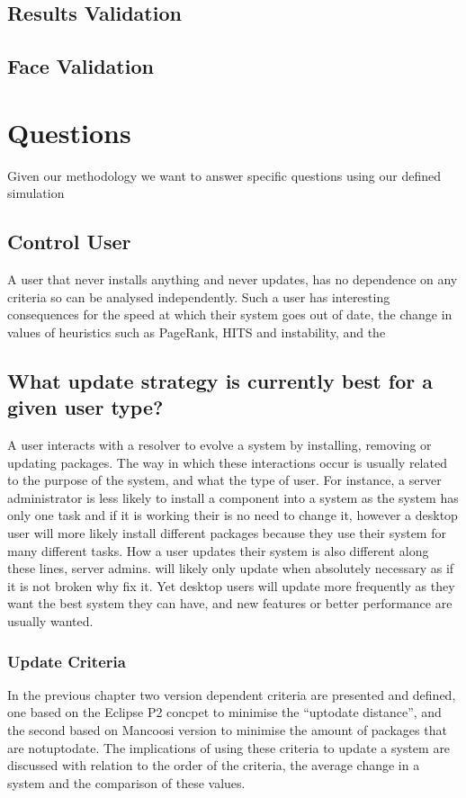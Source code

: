 \subsection{Results Validation}

\subsection{Face Validation}


\section{Questions}
Given our methodology we want to answer specific questions using our defined simulation

\subsection{Control User}
{}A user that never installs anything and never updates, has no dependence on any criteria so can be analysed independently.
{}Such a user has interesting consequences for the speed at which their system goes out of date, the change in values of heuristics such as PageRank, HITS and instability,
{}and the 

\subsection{What update strategy is currently best for a given user type?}
A user interacts with a resolver to evolve a system by installing, removing or updating packages.
The way in which these interactions occur is usually related to the purpose of the system, and what the type of user.
For instance, a server administrator is less likely to install a component into a system as the system has only one task and if it is working their is no need to change it, 
however a desktop user will more likely install different packages because they use their system for many different tasks.
How a user updates their system is also different along these lines, server admins. will likely only update when absolutely necessary as if it is not broken why fix it.
Yet desktop users will update more frequently as they want the best system they can have, and new features or better performance are usually wanted.


\subsubsection{Update Criteria}
{}In the previous chapter two version dependent criteria are presented and defined, one based on the Eclipse P2 concpet to minimise the ``uptodate distance'', 
{}and the second based on Mancoosi version to minimise the amount of packages that are notuptodate. 
{}The implications of using these criteria to update a system are discussed with relation to the order of the criteria, the average change in a system and the comparison of these values.

